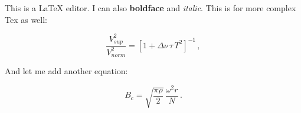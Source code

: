This is a LaTeX editor. I can also \textbf{boldface} and \textit{italic}. This is for more complex Tex as well:

\begin{equation}
\frac{V_{ sup}^2}{V_{ norm}^2} = [1 + \Delta \nu \, \tau \, T^2 ]^{-1} \, ,
\end{equation}

And let me add another equation:

\begin{equation}
B_c= \sqrt{\frac{\pi \rho}{2}} \, \frac{\omega^2 r}{N} \, .
\end{equation}